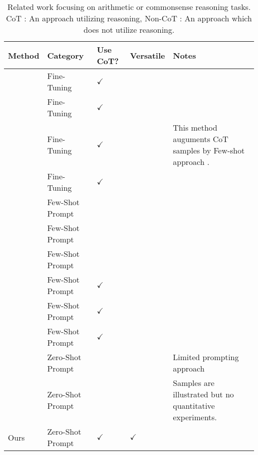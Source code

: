 \begin{table}[t]\centering
\scriptsize
\begin{tabular}{|p{}|p{}|p{}|p{}|p{}|}
\toprule
Method &Category &Use CoT? & Versatile &Notes \\\hline \hline
\cite{gsm8k} &Fine-Tuning &$\checkmark$ & & \\\hline
\cite{yourself} &Fine-Tuning &$\checkmark$ & & \\\hline
\cite{star} &Fine-Tuning &$\checkmark$ & &This method auguments CoT samples by Few-shot approach \cite{cot_wei}. \\\hline
\cite{scratchpad} &Fine-Tuning &$\checkmark$ & & \\\hline
\hline
\cite{gpt3} &Few-Shot Prompt & & & \\\hline
\cite{megatron} &Few-Shot Prompt & & &\\\hline
\cite{gopher} &Few-Shot Prompt & & & \\\hline
\cite{palm} &Few-Shot Prompt &$\checkmark$ & & \\\hline
\cite{cot_wei} &Few-Shot Prompt &$\checkmark$ & & \\\hline
\cite{cot_wei_sc} &Few-Shot Prompt &$\checkmark$ & & \\\hline
\hline
\cite{selftalk} &Zero-Shot Prompt & & &Limited prompting approach \\\hline
\cite{prompt1} &Zero-Shot Prompt & & &Samples are illustrated but no quantitative experiments. \\\hline
Ours &Zero-Shot Prompt & $\checkmark$ &$\checkmark$ & \\
\hline
\end{tabular}
\captionsetup{skip=5pt}
\caption{Related work focusing on arithmetic or commonsense reasoning tasks. CoT : An approach utilizing \CoT reasoning, Non-CoT : An approach which does not utilize \CoT reasoning.    }
\label{tab:related_work}
\end{table}
